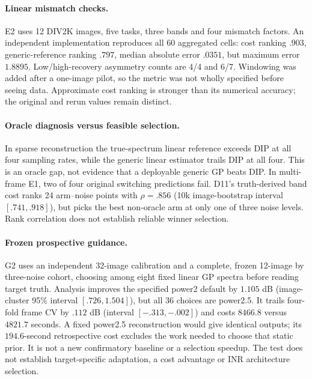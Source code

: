 \paragraph{Linear mismatch checks.} E2 uses 12 DIV2K images, five tasks, three bands and four mismatch factors. An independent implementation reproduces all 60 aggregated cells: cost ranking $.903$, generic-reference ranking $.797$, median absolute error $.0351$, but maximum error $1.8895$. Low/high-recovery asymmetry counts are 4/4 and 6/7. Windowing was added after a one-image pilot, so the metric was not wholly specified before seeing data. Approximate cost ranking is stronger than its numerical accuracy; the original and rerun values remain distinct.

\paragraph{Oracle diagnosis versus feasible selection.} In sparse reconstruction the true-spectrum linear reference exceeds DIP at all four sampling rates, while the generic linear estimator trails DIP at all four. This is an oracle gap, not evidence that a deployable generic GP beats DIP. In multi-frame E1, two of four original switching predictions fail. D11's truth-derived band cost ranks 24 arm--noise points with $\rho=.856$ (10k image-bootstrap interval $[.741,.918]$), but picks the best non-oracle arm at only one of three noise levels. Rank correlation does not establish reliable winner selection.

\paragraph{Frozen prospective guidance.} G2 uses an independent 32-image calibration and a complete, frozen 12-image by three-noise cohort, choosing among eight fixed linear GP spectra before reading target truth. Analysis improves the specified power2 default by $1.105$ dB (image-cluster 95\% interval $[.726,1.504]$), but all 36 choices are power2.5. It trails four-fold frame CV by $.112$ dB (interval $[-.313,-.002]$) and costs $8466.8$ versus $4821.7$ seconds. A fixed power2.5 reconstruction would give identical outputs; its $194.6$-second retrospective cost excludes the work needed to choose that static prior. It is not a new confirmatory baseline or a selection speedup. The test does not establish target-specific adaptation, a cost advantage or INR architecture selection.

